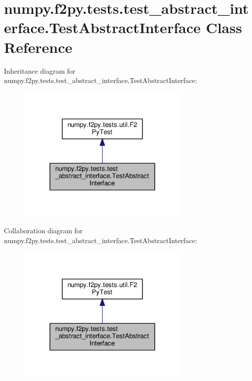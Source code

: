 \hypertarget{classnumpy_1_1f2py_1_1tests_1_1test__abstract__interface_1_1TestAbstractInterface}{}\section{numpy.\+f2py.\+tests.\+test\+\_\+abstract\+\_\+interface.\+Test\+Abstract\+Interface Class Reference}
\label{classnumpy_1_1f2py_1_1tests_1_1test__abstract__interface_1_1TestAbstractInterface}


Inheritance diagram for numpy.\+f2py.\+tests.\+test\+\_\+abstract\+\_\+interface.\+Test\+Abstract\+Interface\+:
\nopagebreak
\begin{figure}[H]
\begin{center}
\leavevmode
\includegraphics[width=239pt]{classnumpy_1_1f2py_1_1tests_1_1test__abstract__interface_1_1TestAbstractInterface__inherit__graph}
\end{center}
\end{figure}


Collaboration diagram for numpy.\+f2py.\+tests.\+test\+\_\+abstract\+\_\+interface.\+Test\+Abstract\+Interface\+:
\nopagebreak
\begin{figure}[H]
\begin{center}
\leavevmode
\includegraphics[width=239pt]{classnumpy_1_1f2py_1_1tests_1_1test__abstract__interface_1_1TestAbstractInterface__coll__graph}
\end{center}
\end{figure}
